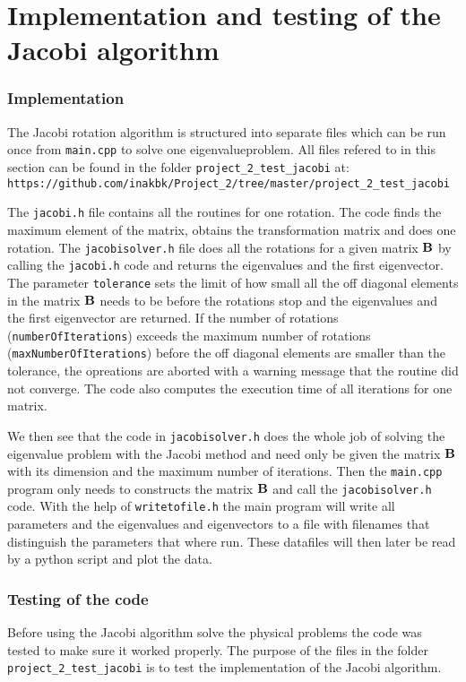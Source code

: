 \documentclass[11pt,a4wide]{article}
\begin{document}
\section{Implementation and testing of the Jacobi algorithm} \label{sec: test_jacobi}
\subsubsection*{Implementation}
The Jacobi rotation algorithm is structured into separate files which can be run once from \texttt{main.cpp} to solve one eigenvalueproblem. All files refered to in this section can be found in the folder \texttt{project\_2\_test\_jacobi} at: \\
\texttt{https://github.com/inakbk/Project\_2/tree/master/project\_2\_test\_jacobi}

The \texttt{jacobi.h} file contains all the routines for one rotation. The code finds the maximum element of the matrix, obtains the transformation matrix and does one rotation. The \texttt{jacobisolver.h} file does all the rotations for a given matrix $\bf B$ by calling the \texttt{jacobi.h} code and returns the eigenvalues and the first eigenvector. The parameter \texttt{tolerance} sets the limit of how small all the off diagonal elements in the matrix $\bf B$ needs to be before the rotations stop and the eigenvalues and the first eigenvector are returned. If the number of rotations (\texttt{numberOfIterations}) exceeds the maximum number of rotations (\texttt{maxNumberOfIterations}) before the off diagonal elements are smaller than the tolerance, the opreations are aborted with a warning message that the routine did not converge. The code also computes the execution time of all iterations for one matrix. 

We then see that the code in \texttt{jacobisolver.h} does the whole job of solving the eigenvalue problem with the Jacobi method and need only be given the matrix $\bf B$ with its dimension and the maximum number of iterations. Then the \texttt{main.cpp} program only needs to constructs the matrix $\bf B$ and call the \texttt{jacobisolver.h} code. With the help of \texttt{writetofile.h} the main program will write all parameters and the eigenvalues and eigenvectors to a file with filenames that distinguish the parameters that where run. These datafiles will then later be read by a python script and plot the data. 

\subsubsection*{Testing of the code}
Before using the Jacobi algorithm solve the physical problems the code was tested to make sure it worked properly. The purpose of the files in the folder \texttt{project\_2\_test\_jacobi} is to test the implementation of the Jacobi algorithm.
\end{document}
